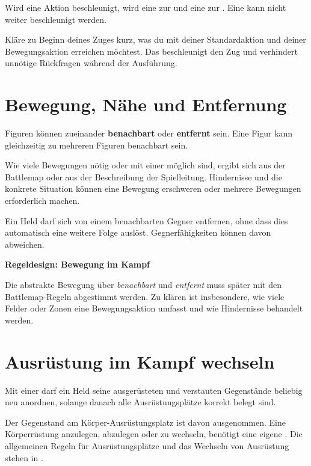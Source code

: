 Wird eine Aktion beschleunigt, wird eine \standardAction{} zur \moveAction{} und eine \moveAction{} zur \freeAction. Eine \freeAction{} kann nicht weiter beschleunigt werden.

\begin{tip}[title=Tipp: Aktionen zuerst planen]
Kläre zu Beginn deines Zuges kurz, was du mit deiner Standardaktion und deiner Bewegungsaktion erreichen möchtest. Das beschleunigt den Zug und verhindert unnötige Rückfragen während der Ausführung.
\end{tip}

\section{Bewegung, Nähe und Entfernung}

Figuren können zueinander \textbf{benachbart} oder \textbf{entfernt} sein. Eine Figur kann gleichzeitig zu mehreren Figuren benachbart sein.

Wie viele Bewegungen nötig oder mit einer \moveAction{} möglich sind, ergibt sich aus der Battlemap oder aus der Beschreibung der Spielleitung. Hindernisse und die konkrete Situation können eine Bewegung erschweren oder mehrere Bewegungen erforderlich machen.

Ein Held darf sich von einem benachbarten Gegner entfernen, ohne dass dies automatisch eine weitere Folge auslöst. Gegnerfähigkeiten können davon abweichen.

\begin{todo}
\textbf{Regeldesign: Bewegung im Kampf}

Die abstrakte Bewegung über \emph{benachbart} und \emph{entfernt} muss später mit den Battlemap-Regeln abgestimmt werden. Zu klären ist insbesondere, wie viele Felder oder Zonen eine Bewegungsaktion umfasst und wie Hindernisse behandelt werden.
\end{todo}

\section{Ausrüstung im Kampf wechseln}

Mit einer \moveAction{} darf ein Held seine ausgerüsteten und verstauten Gegenstände beliebig neu anordnen, solange danach alle Ausrüstungsplätze korrekt belegt sind.

Der Gegenstand am Körper-Ausrüstungsplatz ist davon ausgenommen. Eine Körperrüstung anzulegen, abzulegen oder zu wechseln, benötigt eine eigene \standardAction. Die allgemeinen Regeln für Ausrüstungsplätze und das Wechseln von Ausrüstung stehen in .

